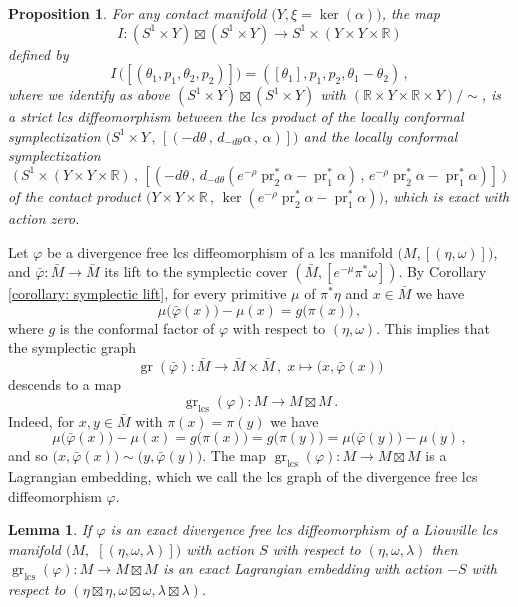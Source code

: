 \documentclass{amsart}
\DeclareMathOperator{\gr}{gr}
\DeclareMathOperator{\pr}{pr}
\DeclareMathOperator{\lcs}{lcs}
\newtheorem{prop}[thm]{Proposition}
\newtheorem{lemma}[thm]{Lemma}
\theoremstyle{remark}
\begin{document}
\begin{prop}\label{proposition: lcs product}
For any contact manifold
$\big(Y, \xi = \ker(\alpha)\big)$,
the map
\[
I: (S^1 \times Y) \boxtimes (S^1 \times Y)
\rightarrow S^1 \times (Y \times Y \times \mathbb{R})
\]
defined by
\[
I \, \big( [(\theta_1, p_1, \theta_2, p_2)] \big) = ([\theta_1], p_1, p_2, \theta_1 - \theta_2) \,,
\]
where we identify as above $(S^1 \times Y) \boxtimes (S^1 \times Y)$
with $(\mathbb{R} \times Y \times \mathbb{R} \times Y)/\sim$,
is a strict lcs diffeomorphism
between the lcs product of the locally conformal symplectization
$\big(S^1 \times Y \,,\, [(-d\theta \,,\, d_{-d\theta}\alpha \,,\, \alpha)] \big)$
and the locally conformal symplectization
\[
\big( \, S^1 \times (Y \times Y \times \mathbb{R}) \,,\,
[( -d\theta \,,\,
d_{-d\theta} ( e^{-\rho} \pr_2^{\ast} \alpha - \pr_1^{\ast} \alpha) \,,\,
e^{-\rho} \pr_2^{\ast} \alpha - \pr_1^{\ast} \alpha
)] \, \big)
\]
of the contact product
$\big( Y \times Y \times \mathbb{R} \,,\,
\ker ( e^{-\rho} \pr_2^{\ast} \alpha - \pr_1^{\ast} \alpha) \big)$,
which is exact with action zero.
\end{prop}

Let $\varphi$ be a divergence free lcs diffeomorphism
of a lcs manifold $\big( M, [(\eta, \omega)] \big)$,
and $\bar{\varphi}: \bar{M} \rightarrow \bar{M}$
its lift to the symplectic cover
$(\bar{M}, [e^{-\mu} \pi^{\ast}\omega])$.
By Corollary \ref{corollary: symplectic lift},
for every primitive $\mu$ of $\pi^{\ast}\eta$
and $x \in \bar{M}$
we have
\[
\mu \big(\bar{\varphi}(x)\big) - \mu (x) = g \big(\pi(x)\big) \,,
\]
where $g$ is the conformal factor of $\varphi$
with respect to $(\eta, \omega)$.
This implies that the symplectic graph
\[
\gr (\bar{\varphi}): \bar{M} \rightarrow \bar{M} \times \bar{M} \,,\;
x \mapsto \big( x , \bar{\varphi}(x)\big)
\]
descends to a map
\[
\gr_{\lcs} (\varphi): M \rightarrow M \boxtimes M \,.
\]
Indeed,
for $x, y \in \bar{M}$ with $\pi (x) = \pi (y)$
we have
\[
\mu \big(\bar{\varphi}(x)\big) - \mu (x)
= g \big(\pi (x)\big)
= g \big(\pi (y)\big)
= \mu \big(\bar{\varphi}(y)\big) - \mu (y) \,,
\]
and so $\big(x, \bar{\varphi}(x)\big) \sim \big(y, \bar{\varphi}(y)\big)$.
The map $\gr_{\lcs} (\varphi): M \rightarrow M \boxtimes M$
is a Lagrangian embedding,
which we call the lcs graph
of the divergence free lcs diffeomorphism $\varphi$.

\begin{lemma}\label{lemma: graph exact}
If $\varphi$ is an exact divergence free
lcs diffeomorphism of a Liouville lcs manifold
$\big( M,$ $ [(\eta, \omega, \lambda)] \big)$
with action $S$
with respect to $(\eta, \omega, \lambda)$
then $\gr_{\lcs} (\varphi): M \rightarrow M \boxtimes M$
is an exact Lagrangian embedding
with action $- S$
with respect to
$(\eta \boxtimes \eta, \omega \boxtimes \omega, \lambda \boxtimes \lambda)$.
\end{lemma}
\end{document}
